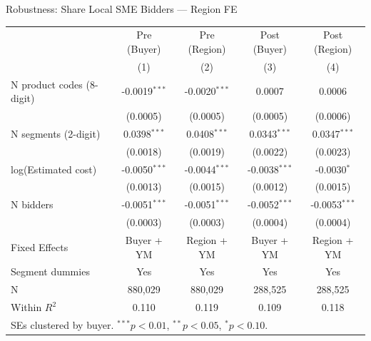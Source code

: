 \documentclass[9pt,aspectratio=169]{beamer}
\begin{document}
\begin{frame}[noframenumbering]{Robustness: Share Local SME Bidders --- Region FE}
\centering\small
\begin{tabular}{lcccc}
\toprule
 & Pre (Buyer) & Pre (Region) & Post (Buyer) & Post (Region) \\
 & (1) & (2) & (3) & (4) \\
\midrule
N product codes (8-digit) & -0.0019$^{***}$ & -0.0020$^{***}$ & 0.0007 & 0.0006 \\
 & (0.0005) & (0.0005) & (0.0005) & (0.0006) \\[2pt]
N segments (2-digit) & 0.0398$^{***}$ & 0.0408$^{***}$ & 0.0343$^{***}$ & 0.0347$^{***}$ \\
 & (0.0018) & (0.0019) & (0.0022) & (0.0023) \\[2pt]
log(Estimated cost) & -0.0050$^{***}$ & -0.0044$^{***}$ & -0.0038$^{***}$ & -0.0030$^{*}$ \\
 & (0.0013) & (0.0015) & (0.0012) & (0.0015) \\[2pt]
N bidders & -0.0051$^{***}$ & -0.0051$^{***}$ & -0.0052$^{***}$ & -0.0053$^{***}$ \\
 & (0.0003) & (0.0003) & (0.0004) & (0.0004) \\[2pt]
\midrule
Fixed Effects & Buyer + YM & Region + YM & Buyer + YM & Region + YM \\
Segment dummies & Yes & Yes & Yes & Yes \\
N & 880,029 & 880,029 & 288,525 & 288,525 \\
Within $R^2$ & 0.110 & 0.119 & 0.109 & 0.118 \\
\bottomrule
\multicolumn{5}{l}{\footnotesize SEs clustered by buyer. $^{***}p<0.01$, $^{**}p<0.05$, $^{*}p<0.10$.} \\
\end{tabular}
\end{frame}
\end{document}
